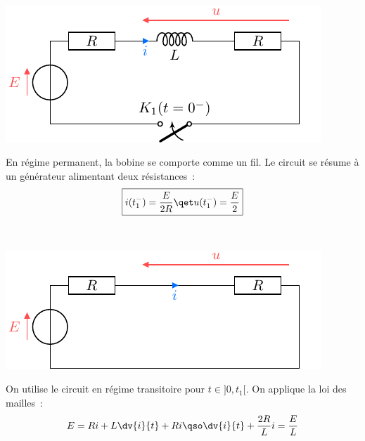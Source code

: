 \documentclass[a4paper, 10pt, garamond, oneside]{book}
\begin{document}
{\begin{enumerate}
		\hfill
		\begin{minipage}[t]{.49\linewidth}
			~
			\vspace{-20pt}
			\begin{center}
				\includegraphics[width=\linewidth]{transRL_q1}
			\end{center}
		\end{minipage}
		\vspace{10pt}
		 \label{Q:perm1}\noindent
		\begin{minipage}[t]{.49\linewidth}
			En régime permanent, la bobine se comporte comme un fil. Le
			circuit se résume à un générateur alimentant deux résistances~:
			\[
				\boxed{
					i(t_1^-)=\frac{E}{2R}
					\qet
					u(t_1^-)=\frac{E}{2}
				}
			\]
		\end{minipage}
		\hfill
		\begin{minipage}[t]{.49\linewidth}
			~
			\vspace{-30pt}
			\begin{center}
				\includegraphics[width=\linewidth]{transRL_q2}
			\end{center}
		\end{minipage}
		 On utilise le circuit en régime transitoire pour $t\in]0,t_1[$. On
		applique la loi des mailles~:
		\begin{gather*}
			E=Ri+L\dv{i}{t}+Ri
			\qso
			\dv{i}{t}+\frac{2R}{L}i=\frac{E}{L}

\end{gather*}
\end{enumerate}}
\end{document}
